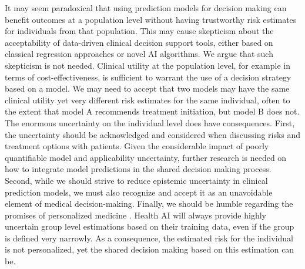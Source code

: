 It may seem paradoxical that using prediction models for decision making can benefit outcomes at a population level without having trustworthy risk estimates for individuals from that population. This may cause skepticism about the acceptability of data-driven clinical decision support tools, either based on classical regression approaches or novel \gls{AI} algorithms. We argue that such skepticism is not needed. Clinical utility at the population level, for example in terms of cost-effectiveness, is sufficient to warrant the use of a decision strategy based on a model. We may need to accept that two models may have the same clinical utility yet very different risk estimates for the same individual, often to the extent that model A recommends treatment initiation, but model B does not. The enormous uncertainty on the individual level does have consequences. First, the uncertainty should be acknowledged and considered when discussing risks and treatment options with patients. Given the considerable impact of poorly quantifiable model and applicability uncertainty, further research is needed on how to integrate model predictions in the shared decision making process. Second, while we should strive to reduce epistemic uncertainty in clinical prediction models, we must also recognize and accept it as an unavoidable element of medical decision-making. Finally, we should be humble regarding the promises of personalized medicine \cite{sennStatisticalPitfallsPersonalized2018}. Health \gls{AI} will always provide highly uncertain group level estimations based on their training data, even if the group is defined very narrowly. As a consequence, the estimated risk for the individual is not personalized, yet the shared decision making based on this estimation can be.

